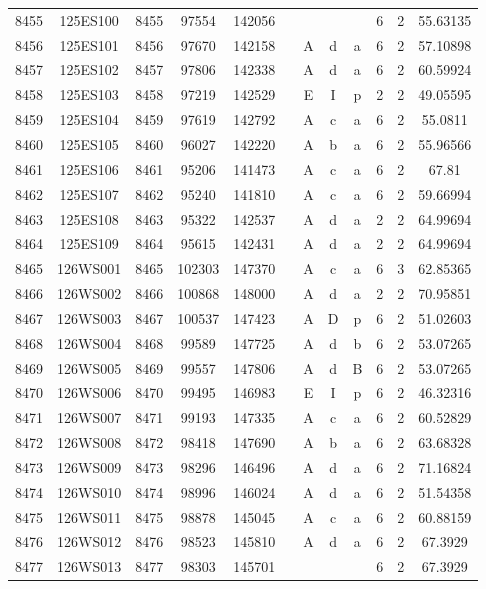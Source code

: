 \begin{tabular}{|*{12}{c|}}
8455 & 125ES100 & 8455 & 97554 & 142056 &  &  &  &  & 6 & 2 & 55.63135 \\ 
8456 & 125ES101 & 8456 & 97670 & 142158 &  & A & d & a & 6 & 2 & 57.10898 \\ 
8457 & 125ES102 & 8457 & 97806 & 142338 &  & A & d & a & 6 & 2 & 60.59924 \\ 
8458 & 125ES103 & 8458 & 97219 & 142529 &  & E & I & p & 2 & 2 & 49.05595 \\ 
8459 & 125ES104 & 8459 & 97619 & 142792 &  & A & c & a & 6 & 2 & 55.0811 \\ 
8460 & 125ES105 & 8460 & 96027 & 142220 &  & A & b & a & 6 & 2 & 55.96566 \\ 
8461 & 125ES106 & 8461 & 95206 & 141473 &  & A & c & a & 6 & 2 & 67.81 \\ 
8462 & 125ES107 & 8462 & 95240 & 141810 &  & A & c & a & 6 & 2 & 59.66994 \\ 
8463 & 125ES108 & 8463 & 95322 & 142537 &  & A & d & a & 2 & 2 & 64.99694 \\ 
8464 & 125ES109 & 8464 & 95615 & 142431 &  & A & d & a & 2 & 2 & 64.99694 \\ 
8465 & 126WS001 & 8465 & 102303 & 147370 &  & A & c & a & 6 & 3 & 62.85365 \\ 
8466 & 126WS002 & 8466 & 100868 & 148000 &  & A & d & a & 2 & 2 & 70.95851 \\ 
8467 & 126WS003 & 8467 & 100537 & 147423 &  & A & D & p & 6 & 2 & 51.02603 \\ 
8468 & 126WS004 & 8468 & 99589 & 147725 &  & A & d & b & 6 & 2 & 53.07265 \\ 
8469 & 126WS005 & 8469 & 99557 & 147806 &  & A & d & B & 6 & 2 & 53.07265 \\ 
8470 & 126WS006 & 8470 & 99495 & 146983 &  & E & I & p & 6 & 2 & 46.32316 \\ 
8471 & 126WS007 & 8471 & 99193 & 147335 &  & A & c & a & 6 & 2 & 60.52829 \\ 
8472 & 126WS008 & 8472 & 98418 & 147690 &  & A & b & a & 6 & 2 & 63.68328 \\ 
8473 & 126WS009 & 8473 & 98296 & 146496 &  & A & d & a & 6 & 2 & 71.16824 \\ 
8474 & 126WS010 & 8474 & 98996 & 146024 &  & A & d & a & 6 & 2 & 51.54358 \\ 
8475 & 126WS011 & 8475 & 98878 & 145045 &  & A & c & a & 6 & 2 & 60.88159 \\ 
8476 & 126WS012 & 8476 & 98523 & 145810 &  & A & d & a & 6 & 2 & 67.3929 \\ 
8477 & 126WS013 & 8477 & 98303 & 145701 &  &  &  &  & 6 & 2 & 67.3929 \\ 

\end{tabular}
